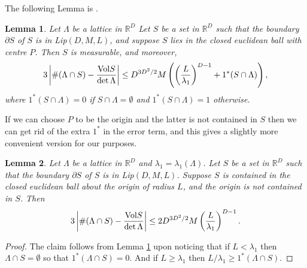 \documentclass[11pt]{amsart}
\newtheorem{lemma}{Lemma}[section]
\numberwithin{equation}{eqncounter}
\def\IR{\mathbb R}
\def\Vol{\textup{Vol}}
\begin{document}
 
The following Lemma is  \cite[Lemma 3.1]{Widmer_Mathemtika_2018}.
\begin{lemma}\label{lem:lattcount}
Let $\Lambda$ be a lattice in $\IR^D$
Let $S$ be a set in $\IR^D$ such that
the boundary $\partial S$ of $S$ is in Lip$(D,M,L)$, and suppose $S$ lies in the closed euclidean 
ball with centre $P$.
Then $S$ is measurable, and moreover,
\begin{alignat*}3
\left|\#(\Lambda \cap S)-\frac{\Vol S}{\det \Lambda}\right|
\leq D^{3D^2/2} M\left(\left(\frac{L}{\lambda_1}\right)^{D-1}+1^*(S\cap \Lambda)\right),
\end{alignat*}
where $1^*(S\cap \Lambda)=0$ if $S\cap \Lambda=\emptyset$ and  $1^*(S\cap \Lambda)=1$
otherwise.
\end{lemma}
If we can choose $P$ to be the origin and the latter is not contained in $S$
then we can get rid of the extra $1^*$ in the error term, and this gives a slightly
more convenient version for our purposes.
\begin{lemma}\label{lem: latticecounting}
Let $\Lambda$ be a lattice in $\IR^D$ and  $\lambda_1=\lambda_1(\Lambda)$.
Let $S$ be a set in $\IR^D$ such that
the boundary $\partial S$ of $S$ is in Lip$(D,M,L)$. Suppose $S$ is contained in the closed euclidean ball about the origin of radius $L$,
and the origin is not contained in $S$.
Then
\begin{alignat*}3
\left|\#(\Lambda\cap S)-\frac{\Vol S}{\det \Lambda}\right|
\leq 2D^{3D^2/2} M\left(\frac{L}{\lambda_1}\right)^{D-1}.
\end{alignat*}
\end{lemma}
\begin{proof}
The claim follows from Lemma \ref{lem:lattcount} upon noticing that
if $L<\lambda_1$ then $\Lambda\cap S=\emptyset$ so that $1^*(\Lambda\cap S)=0$. 
And if $L\geq \lambda_1$ then $L/\lambda_1\geq 1^*(\Lambda\cap S)$.
\end{proof}
\end{document}
